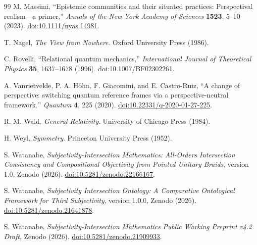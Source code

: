 \documentclass[11pt]{article}
\theoremstyle{definition}
\theoremstyle{remark}
\begin{document}
\begin{thebibliography}{99}
M. Massimi, ``Epistemic communities and their situated practices: Perspectival realism---a primer,'' \emph{Annals of the New York Academy of Sciences} \textbf{1523}, 5--10 (2023). \href{https://doi.org/10.1111/nyas.14981}{doi:10.1111/nyas.14981}.

T. Nagel, \emph{The View from Nowhere}. Oxford University Press (1986).

C. Rovelli, ``Relational quantum mechanics,'' \emph{International Journal of Theoretical Physics} \textbf{35}, 1637--1678 (1996). \href{https://doi.org/10.1007/BF02302261}{doi:10.1007/BF02302261}.

A. Vanrietvelde, P. A. H\"ohn, F. Giacomini, and E. Castro-Ruiz, ``A change of perspective: switching quantum reference frames via a perspective-neutral framework,'' \emph{Quantum} \textbf{4}, 225 (2020). \href{https://doi.org/10.22331/q-2020-01-27-225}{doi:10.22331/q-2020-01-27-225}.

R. M. Wald, \emph{General Relativity}. University of Chicago Press (1984).

H. Weyl, \emph{Symmetry}. Princeton University Press (1952).

S. Watanabe, \emph{Subjectivity-Intersection Mathematics: All-Orders Intersection Consistency and Compositional Objectivity from Pointed Unitary Braids}, version 1.0, Zenodo (2026). \href{https://doi.org/10.5281/zenodo.22166167}{doi:10.5281/zenodo.22166167}.

S. Watanabe, \emph{Subjectivity Intersection Ontology: A Comparative Ontological Framework for Third Subjectivity}, version 1.0.0, Zenodo (2026). \href{https://doi.org/10.5281/zenodo.21641878}{doi:10.5281/zenodo.21641878}.

S. Watanabe, \emph{Subjectivity-Intersection Mathematics Public Working Preprint v4.2 Draft}, Zenodo (2026). \href{https://doi.org/10.5281/zenodo.21909933}{doi:10.5281/zenodo.21909933}.

\end{thebibliography}
\end{document}
